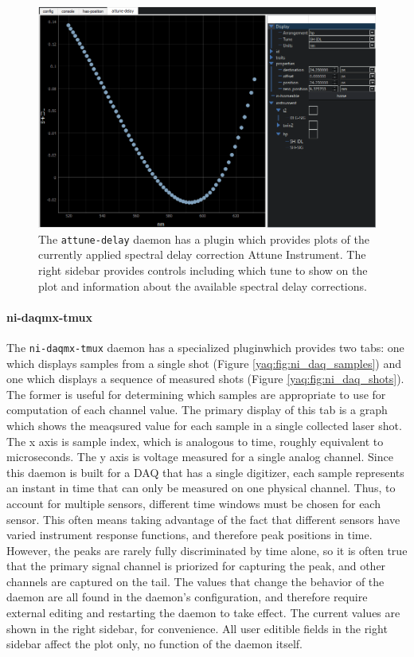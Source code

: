 \begin{landscape}
\begin{figure}
\includegraphics[width=8in]{"yaq/images/attune_delay"}
\caption[\yaqcqtpy{} Attune Delay Plugin]{
	The \texttt{attune-delay} daemon has a plugin which provides plots of the currently applied spectral delay correction Attune Instrument.
	The right sidebar provides controls including which tune to show on the plot and information about the available spectral delay corrections.
}
\label{yaq:fig:attune_delay_plugin}
\end{figure}
\end{landscape}


\paragraph{ni-daqmx-tmux}

The \texttt{ni-daqmx-tmux} daemon has a specialized pluginwhich provides two tabs: one which displays samples from a single shot (Figure \ref{yaq:fig:ni_daq_samples}) and one which displays a sequence of measured shots (Figure \ref{yaq:fig:ni_daq_shots}).
The former is useful for determining which samples are appropriate to use for computation of each channel value.
The primary display of this tab is a graph which shows the meaqsured value for each sample in a single collected laser shot.
The x axis is sample index, which is analogous to time, roughly equivalent to microseconds.
The y axis is voltage measured for a single analog channel.
Since this daemon is built for a DAQ that has a single digitizer, each sample represents an instant in time that can only be measured on one physical channel.
Thus, to account for multiple sensors, different time windows must be chosen for each sensor.
This often means taking advantage of the fact that different sensors have varied instrument response functions, and therefore peak positions in time.
However, the peaks are rarely fully discriminated by time alone, so it is often true that the primary signal channel is priorized for capturing the peak, and other channels are captured on the tail.
The values that change the behavior of the daemon are all found in the daemon's configuration, and therefore require external editing and restarting the daemon to take effect.
The current values are shown in the right sidebar, for convenience.
All user editible fields in the right sidebar affect the plot only, no function of the daemon itself.


